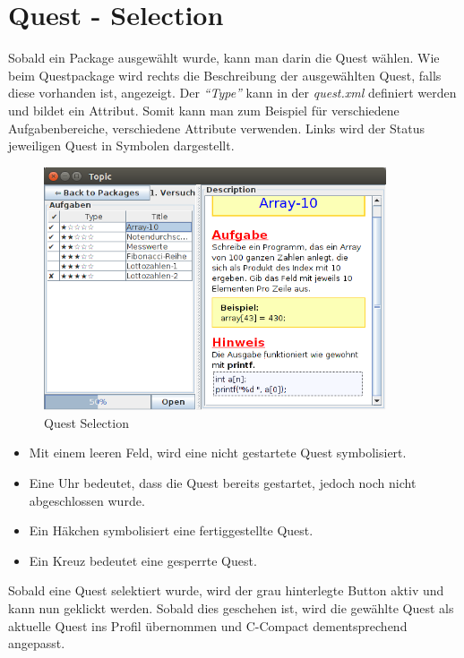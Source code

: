 \section{Quest - Selection}

Sobald ein Package ausgewählt wurde, kann man darin die Quest wählen. Wie beim Questpackage wird rechts die Beschreibung der ausgewählten Quest, falls diese vorhanden ist, angezeigt. Der \textit{"`Type"'} kann in der \textit{quest.xml} definiert werden und bildet ein Attribut. Somit kann man zum Beispiel für verschiedene Aufgabenbereiche, verschiedene Attribute verwenden. Links wird der Status jeweiligen Quest in Symbolen dargestellt.

\begin{figure}[h] 
  \centering
     \includegraphics[width=0.9\textwidth]{./media/images/gui/launcher/package_view.png}
  \caption{Quest Selection}
  \label{fig:Bild1}
\end{figure}

\begin{itemize}
\item Mit einem leeren Feld, wird eine nicht gestartete Quest symbolisiert.
\item Eine Uhr bedeutet, dass die Quest bereits gestartet, jedoch noch nicht abgeschlossen wurde.
\item Ein Häkchen symbolisiert eine fertiggestellte Quest.
\item Ein Kreuz bedeutet eine gesperrte Quest. 
\end{itemize}

Sobald eine Quest selektiert wurde, wird der grau hinterlegte Button aktiv und kann nun geklickt werden. Sobald dies geschehen ist, wird die gewählte Quest als aktuelle Quest ins Profil übernommen und C-Compact dementsprechend angepasst.

